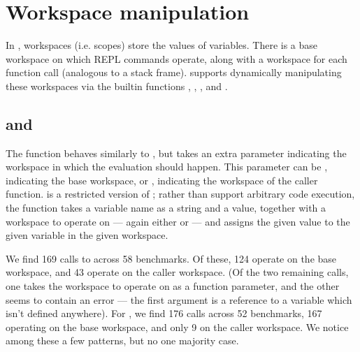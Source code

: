 \section{Workspace manipulation}

In \matlab, workspaces (i.e. scopes) store the values of variables. There is a
base workspace on which REPL commands operate, along with a workspace for each
function call (analogous to a stack frame). \matlab supports dynamically
manipulating these workspaces via the builtin functions ,
, , and .


\subsection{ and }

The  function behaves similarly to , but takes an extra
parameter indicating the workspace in which the evaluation should happen. This
parameter can be , indicating the \matlab base workspace, or
, indicating the workspace of the caller function.
 is a restricted version of ; rather than support
arbitrary code execution, the function takes a variable name as a string and a
value, together with a workspace to operate on --- again either 
or  --- and assigns the given value to the given variable in the
given workspace.

We find 169 calls to  across 58 benchmarks. Of these, 124 operate
on the base workspace, and 43 operate on the caller workspace. (Of the two
remaining calls, one takes the workspace to operate on as a function parameter,
and the other seems to contain an error --- the first argument is a reference
to a variable which isn't defined anywhere). For , we find 176
calls across 52 benchmarks, 167 operating on the base workspace, and only 9 on
the caller workspace. We notice among these a few patterns, but no one majority
case.

